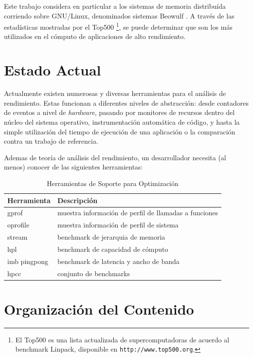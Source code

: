 \documentclass[a4paper]{report}
\begin{document}
Este trabajo considera en particular a los sistemas de memoria distribu\'ida corriendo sobre
GNU/Linux, denominados sistemas Beowulf \cite{beowulf}. A trav\'es de las
estad\'isticas mostradas por el Top500 \footnote{El Top500 es una lista actualizada de supercomputadoras
de acuerdo al benchmark Linpack, disponible en {\tt http://www.top500.org}.}, se
puede determinar que son los m\'as utilizados en el c\'omputo de aplicaciones de alto rendimiento.

\section{Estado Actual}

Actualmente existen numerosas y diversas herramientas para el an\'alisis de rendimiento.
Estas funcionan a diferentes niveles de abstracci\'on: desde contadores de eventos
a nivel de {\it hardware}, pasando por monitores de recursos dentro del n\'ucleo del sistema operativo,
instrumentaci\'on autom\'atica de c\'odigo, y hasta la simple utilizaci\'on del tiempo de ejecuci\'on 
de una aplicaci\'on o la comparaci\'on contra un trabajo de referencia.

\bigskip

Ademas de teor\'ia de an\'alisis del rendimiento, un desarrollador necesita
(al menos) conocer de las siguientes herramientas:

\begin{table}[H]
    \caption{Herramientas de Soporte para Optimizaci\'on}
    \centering
    \begin{tabular}{|l|l|}\hline
      {\bf Herramienta} & {\bf Descripci\'on} \\ \hline
      gprof & muestra informaci\'on de perfil de llamadas a funciones \\ \hline
      oprofile & muestra informaci\'on de perfil de sistema \\ \hline
      stream & benchmark de jerarquia de memoria \\ \hline
      hpl & benchmark de capacidad de c\'omputo \\ \hline
      imb pingpong & benchmark de latencia y ancho de banda \\ \hline
      hpcc & conjunto de benchmarks \\ \hline
    \end{tabular}
    \label{table:tools}
\end{table}

\section{Organizaci\'on del Contenido}
\end{document}
